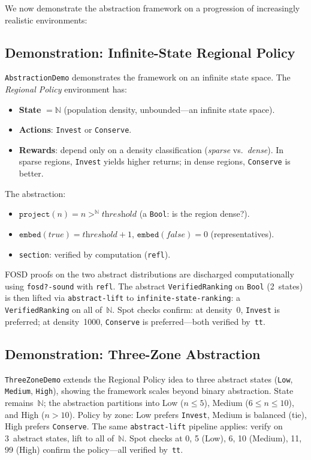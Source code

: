 \documentclass[9pt,a4paper]{article}
\theoremstyle{plain}
\theoremstyle{definition}
\theoremstyle{remark}
\begin{document}
We now demonstrate the abstraction framework on a progression of increasingly realistic environments:

\subsection{Demonstration: Infinite-State Regional Policy}

\texttt{AbstractionDemo} demonstrates the framework on an infinite state space.  The \emph{Regional Policy} environment has:
\begin{itemize}
\item \textbf{State} $= \mathbb{N}$ (population density, unbounded---an infinite state space).
\item \textbf{Actions}: \texttt{Invest} or \texttt{Conserve}.
\item \textbf{Rewards}: depend only on a density classification (\emph{sparse} vs.\ \emph{dense}).  In sparse regions, \texttt{Invest} yields higher returns; in dense regions, \texttt{Conserve} is better.
\end{itemize}

The abstraction:
\begin{itemize}
\item $\texttt{project}(n) = n >^{\mathbb{N}} \textit{threshold}$ (a \texttt{Bool}: is the region dense?).
\item $\texttt{embed}(\textit{true}) = \textit{threshold} + 1$, $\texttt{embed}(\textit{false}) = 0$ (representatives).
\item \texttt{section}: verified by computation (\texttt{refl}).
\end{itemize}

FOSD proofs on the two abstract distributions are discharged computationally using \texttt{fosd?-sound} with \texttt{refl}.  The abstract \texttt{VerifiedRanking} on \texttt{Bool} (2~states) is then lifted via \texttt{abstract-lift} to \texttt{infinite-state-ranking}: a \texttt{VerifiedRanking} on all of~$\mathbb{N}$.  Spot checks confirm: at density~0, \texttt{Invest} is preferred; at density~1000, \texttt{Conserve} is preferred---both verified by~\texttt{tt}.

\subsection{Demonstration: Three-Zone Abstraction}

\texttt{ThreeZoneDemo} extends the Regional Policy idea to three abstract states (\texttt{Low}, \texttt{Medium}, \texttt{High}), showing the framework scales beyond binary abstraction.  State remains~$\mathbb{N}$; the abstraction partitions into Low ($n \le 5$), Medium ($6 \le n \le 10$), and High ($n > 10$).  Policy by zone: Low prefers \texttt{Invest}, Medium is balanced (tie), High prefers \texttt{Conserve}.  The same \texttt{abstract-lift} pipeline applies: verify on 3~abstract states, lift to all of~$\mathbb{N}$.  Spot checks at 0, 5 (Low), 6, 10 (Medium), 11, 99 (High) confirm the policy---all verified by~\texttt{tt}.
\end{document}
